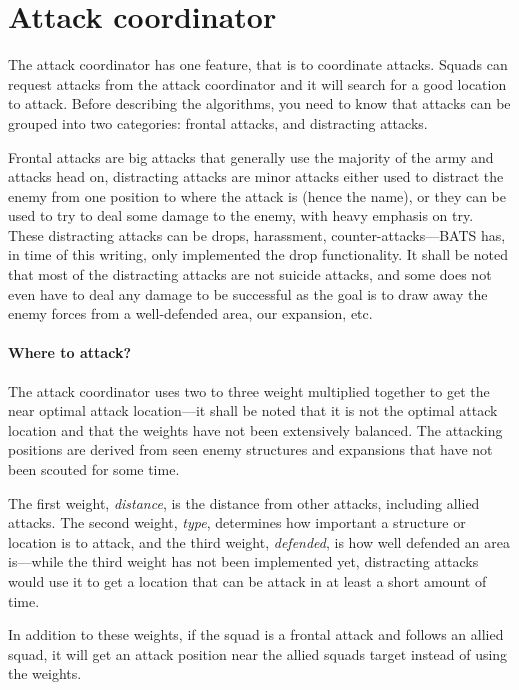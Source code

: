 
\section{Attack coordinator}
The attack coordinator has one feature, that is to coordinate attacks. Squads can request attacks from the attack coordinator and it will search for a good location to attack. Before describing the algorithms, you need to know that attacks can be grouped into two categories: frontal attacks, and distracting attacks.

Frontal attacks are big attacks that generally use the majority of the army and attacks head on, distracting attacks are minor attacks either used to distract the enemy from one position to where the attack is (hence the name), or they can be used to try to deal some damage to the enemy, with heavy emphasis on try. These distracting attacks can be drops, harassment, counter-attacks—BATS has, in time of this writing, only implemented the drop functionality. It shall be noted that most of the distracting attacks are not suicide attacks, and some does not even have to deal any damage to be successful as the goal is to draw away the enemy forces from a well-defended area, our expansion, etc.

\paragraph{Where to attack?}
The attack coordinator uses two to three weight multiplied together to get the near optimal attack location—it shall be noted that it is not the optimal attack location and that the weights have not been extensively balanced. The attacking positions are derived from seen enemy structures and expansions that have not been scouted for some time.

The first weight, \emph{distance}, is the distance from other attacks, including allied attacks. The second weight, \emph{type}, determines how important a structure or location is to attack, and the third weight, \emph{defended}, is how well defended an area is—while the third weight has not been implemented yet, distracting attacks would use it to get a location that can be attack in at least a short amount of time.

In addition to these weights, if the squad is a frontal attack and follows an allied squad, it will get an attack position near the allied squads target instead of using the weights.

